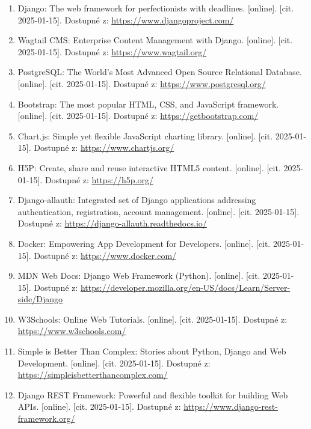 \documentclass[12pt, a4paper,
twoside,
openany
]{report}
\begin{document}
	\begin{enumerate}
		\item Django: The web framework for perfectionists with deadlines. [online]. [cit. 2025-01-15]. Dostupné z: \url{https://www.djangoproject.com/}
		
		\item Wagtail CMS: Enterprise Content Management with Django. [online]. [cit. 2025-01-15]. Dostupné z: \url{https://www.wagtail.org/}
		
		\item PostgreSQL: The World's Most Advanced Open Source Relational Database. [online]. [cit. 2025-01-15]. Dostupné z: \url{https://www.postgresql.org/}
		
		\item Bootstrap: The most popular HTML, CSS, and JavaScript framework. [online]. [cit. 2025-01-15]. Dostupné z: \url{https://getbootstrap.com/}
		
		\item Chart.js: Simple yet flexible JavaScript charting library. [online]. [cit. 2025-01-15]. Dostupné z: \url{https://www.chartjs.org/}
		
		\item H5P: Create, share and reuse interactive HTML5 content. [online]. [cit. 2025-01-15]. Dostupné z: \url{https://h5p.org/}
		
		\item Django-allauth: Integrated set of Django applications addressing authentication, registration, account management. [online]. [cit. 2025-01-15]. Dostupné z: \url{https://django-allauth.readthedocs.io/}
		
		\item Docker: Empowering App Development for Developers. [online]. [cit. 2025-01-15]. Dostupné z: \url{https://www.docker.com/}
		
		\item MDN Web Docs: Django Web Framework (Python). [online]. [cit. 2025-01-15]. Dostupné z: \url{https://developer.mozilla.org/en-US/docs/Learn/Server-side/Django}
		
		\item W3Schools: Online Web Tutorials. [online]. [cit. 2025-01-15]. Dostupné z: \url{https://www.w3schools.com/}
		
		\item Simple is Better Than Complex: Stories about Python, Django and Web Development. [online]. [cit. 2025-01-15]. Dostupné z: \url{https://simpleisbetterthancomplex.com/}
		
		\item Django REST Framework: Powerful and flexible toolkit for building Web APIs. [online]. [cit. 2025-01-15]. Dostupné z: \url{https://www.django-rest-framework.org/}
	\end{enumerate}
\end{document}
